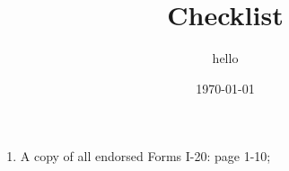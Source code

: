 \documentclass[a4paper, 12pt]{article}
\title{Checklist}
\date{\today}
\author{hello}
\begin{document}
\maketitle

\begin{enumerate}
\item A copy of all endorsed Forms I-20: page 1-10;
\end{enumerate}

\end{document}

